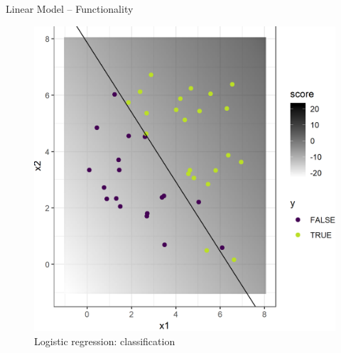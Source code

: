\documentclass[11pt,compress,t,notes=noshow, xcolor=table]{beamer}
\begin{document}
\begin{frame}{Linear Model -- Functionality}
\begin{minipage}{0.32\textwidth}
\begin{center}
\begin{figure}[h!]
        \end{figure}
        \end{center}
      \end{minipage}
    \begin{minipage}{0.32\textwidth}
    \begin{center}
    \begin{figure}[h!]
      \caption{Logistic regression: classification}
      \includegraphics[height=0.6\textwidth, keepaspectratio=true]{figure/logreg-2vars-data.png}
     
    \end{figure}
    \end{center}
    \end{minipage}


\end{frame}

\end{document}
